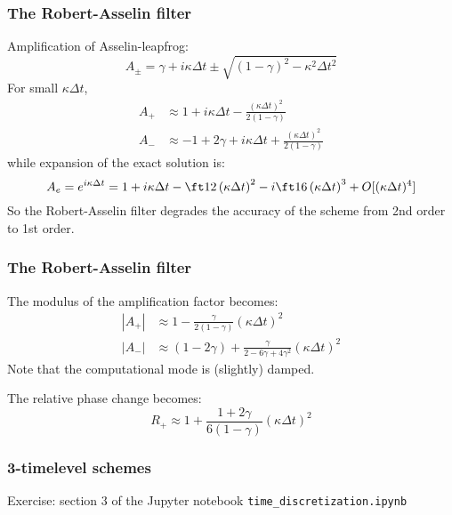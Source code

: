 \documentclass[aspectratio=43,9pt]{beamer}
\begin{document}
%
%
%
\begin{frame}
	\frametitle{The Robert-Asselin filter}
	Amplification of Asselin-leapfrog:
	\begin{equation*}
		A_\pm = \gamma + i \kappa \Delta t \pm \sqrt{\left( 1 - \gamma \right)^2 - \kappa^2 \Delta t^2}
	\end{equation*}
	For small $\kappa \Delta t$, 
	\begin{align*}
		A_+ & \approx 1 + i \kappa \Delta t -\frac{(\kappa \Delta t)^2}{2 (1-\gamma)}	\\
		A_-	&	\approx -1+2\gamma+i\kappa\Delta t+\frac{(\kappa \Delta t)^2}{2 (1-\gamma)}
	\end{align*}
	while expansion of the exact solution is:
	\begin{equation*}
		A_e = e^{i \kappa \Delta t} = 1 +i \kappa \Delta t - \ft12 \left( \kappa \Delta t \right)^2- i \ft16 \left( \kappa \Delta t \right)^3 + O[(\kappa \Delta t)^4 ]
	\end{equation*}
	So the Robert-Asselin filter degrades the accuracy of the scheme from 2nd order to 1st order.
\end{frame}
%
%
%
\begin{frame}
	\frametitle{The Robert-Asselin filter}
	The modulus of the amplification factor becomes:
	\begin{align*}
		|A_+| &\approx 1 - \frac{\gamma}{2 (1 - \gamma)} (\kappa \Delta t)^2 \\
		|A_-| &\approx (1-2\gamma) + \frac{\gamma}{2 - 6 \gamma + 4 \gamma^2} (\kappa \Delta t)^2
	\end{align*}
	Note that the computational mode is (slightly) damped.
	\par\vspace*{2ex}
	The relative phase change becomes:
	\begin{equation*}
		R_+ \approx 1 + \frac{1+2\gamma}{6 (1-\gamma)} (\kappa \Delta t)^2
	\end{equation*}
\end{frame}
%
%
\begin{frame}
	\frametitle{3-timelevel schemes}
	Exercise: section 3 of the Jupyter notebook \texttt{time\_discretization.ipynb}
\end{frame}
%
\end{document}
